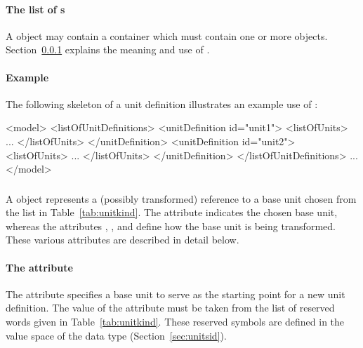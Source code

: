 \paragraph{The list of s}
\label{sec:listofunits}

A \UnitDefinition object may contain a \ListOfUnits container which must
contain one or more \Unit objects. Section~\ref{sec:unit-structure} explains
the meaning and use of \Unit.   

\paragraph{Example}

The following skeleton of a unit definition illustrates an example
use of \UnitDefinition:

\begin{example}

<model>
    <listOfUnitDefinitions>
        <unitDefinition id="unit1">
            <listOfUnits>
                ...
            </listOfUnits>
        </unitDefinition>
        <unitDefinition id="unit2">
            <listOfUnits>
                ...
            </listOfUnits>
        </unitDefinition>
    </listOfUnitDefinitions>
    ...
</model>
\end{example}


\subsubsection{}
\label{sec:unit-structure}

A \Unit object represents a (possibly transformed) reference to
a base unit chosen from the list in
  Table~\vref{tab:unitkind}.  The attribute
 indicates the chosen base unit, whereas the
attributes , , and
 define how the base unit is being transformed.
These various attributes are described in detail below.


\paragraph{The  attribute}

The \Unit attribute  specifies a base unit to serve as
the starting point for a new unit definition.  The value of the
attribute must be taken from the list of reserved words given in
Table~\vref{tab:unitkind}.  These reserved symbols are defined in
the value space of the data type 
(Section~\ref{sec:unitsid}).

